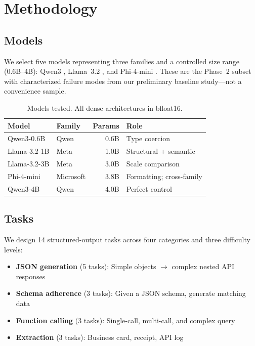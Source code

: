 \documentclass[11pt]{article}
\begin{document}
\section{Methodology}
\label{sec:method}

\subsection{Models}
\label{sec:models}

We select five models representing three families and a controlled size range (0.6B--4B): Qwen3 \citep{qwen3technical}, Llama~3.2 \citep{llama32}, and Phi-4-mini \citep{phi4mini}.
These are the Phase~2 subset with characterized failure modes from our preliminary baseline study---not a convenience sample.

\begin{table}[h]
\centering
\small
\begin{tabular}{llrl}
\toprule
\textbf{Model} & \textbf{Family} & \textbf{Params} & \textbf{Role} \\
\midrule
Qwen3-0.6B & Qwen & 0.6B & Type coercion \\
Llama-3.2-1B & Meta & 1.0B & Structural + semantic \\
Llama-3.2-3B & Meta & 3.0B & Scale comparison \\
Phi-4-mini & Microsoft & 3.8B & Formatting; cross-family \\
Qwen3-4B & Qwen & 4.0B & Perfect control \\
\bottomrule
\end{tabular}
\caption{Models tested. All dense architectures in bfloat16.}
\label{tab:models}
\end{table}

\subsection{Tasks}
\label{sec:tasks}

We design 14 structured-output tasks across four categories and three difficulty levels:

\begin{itemize}
    \item \textbf{JSON generation} (5 tasks): Simple objects $\to$ complex nested API responses
    \item \textbf{Schema adherence} (3 tasks): Given a JSON schema, generate matching data
    \item \textbf{Function calling} (3 tasks): Single-call, multi-call, and complex query
    \item \textbf{Extraction} (3 tasks): Business card, receipt, API log
\end{itemize}
\end{document}
